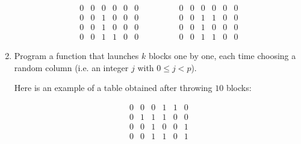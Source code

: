 \documentclass[11pt,class=report,crop=false]{standalone}
\begin{document}
\begin{activite}
\begin{enumerate}
$$\begin{array}{cccccc}
0&0&0&0&0&0\\
0&0&1&0&0&0\\
0&0&1&0&0&0\\
0&0&1&1&0&0
\end{array}\qquad\qquad
\begin{array}{cccccc}
0&0&0&0&0&0\\
0&0&1&1&0&0\\
0&0&1&0&0&0\\
0&0&1&1&0&0
\end{array}
$$
 

 
  \item Program a function  that launches 
  $k$ blocks one by one, each time choosing a random column (i.e. an integer $j$ with $0 \le j < p$). 
  
  Here is an example of a table obtained after throwing $10$ blocks:
  
 
\begin{center}
\begin{minipage}{0.3\textwidth} 
 $$\begin{array}{cccccc} 
0&0&0&1&1&0\\
0&1&1&1&0&0\\
0&0&1&0&0&1\\
0&0&1&1&0&1
\end{array}
$$
\end{minipage}
\begin{minipage}{0.4\textwidth} 
\end{minipage}
\end{center}  

\end{enumerate}

\end{activite}


\end{document}
